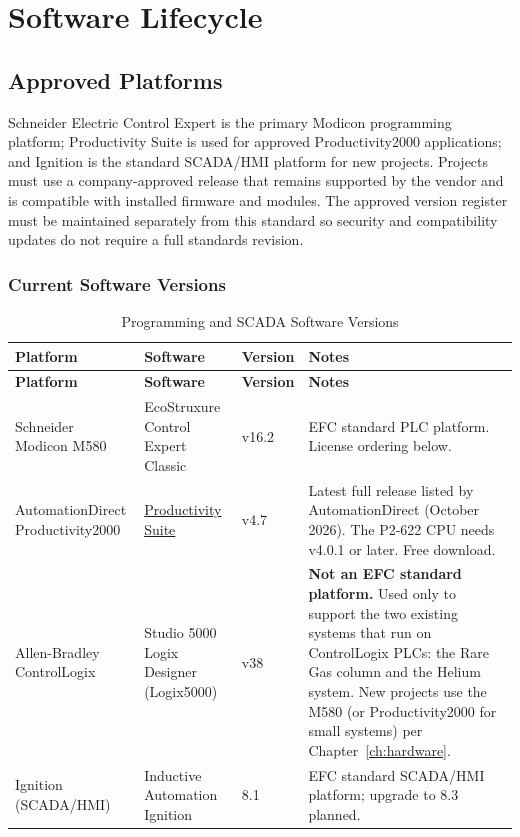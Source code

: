 \chapter{Software Lifecycle}\label{ch:software}
\section{Approved Platforms}
Schneider Electric Control Expert is the primary Modicon programming platform; Productivity Suite is used for approved Productivity2000 applications; and Ignition is the standard SCADA/HMI platform for new projects. Projects must use a company-approved release that remains supported by the vendor and is compatible with installed firmware and modules. The approved version register must be maintained separately from this standard so security and compatibility updates do not require a full standards revision.

\subsection{Current Software Versions}\label{sec:software-versions}
\begin{longtable}{@{}P{3.60cm}P{4.44cm}P{2.33cm}P{6.13cm}@{}}
\caption{Programming and SCADA Software Versions}\label{tab:software-versions} \\
\toprule
{}\textbf{Platform} & \textbf{Software} & \textbf{Version} & \textbf{Notes} \\
\midrule
\endfirsthead
\toprule
{}\textbf{Platform} & \textbf{Software} & \textbf{Version} & \textbf{Notes} \\
\midrule
\endhead
Schneider Modicon M580 & EcoStruxure Control Expert Classic & v16.2 & EFC standard PLC platform. License ordering below. \\
AutomationDirect Productivity2000 & \href{https://www.automationdirect.com/productivity/software/softwarewhatsnew}{Productivity Suite} & v4.7 & Latest full release listed by AutomationDirect (October 2026). The P2-622 CPU needs v4.0.1 or later. Free download. \\
Allen-Bradley ControlLogix & Studio 5000 Logix Designer (Logix5000) & v38 & \textbf{Not an EFC standard platform.} Used only to support the two existing systems that run on ControlLogix PLCs: the Rare Gas column and the Helium system. New projects use the M580 (or Productivity2000 for small systems) per Chapter~\ref{ch:hardware}. \\
Ignition (SCADA/HMI) & Inductive Automation Ignition & 8.1 & EFC standard SCADA/HMI platform; upgrade to 8.3 planned. \\
\bottomrule
\end{longtable}

